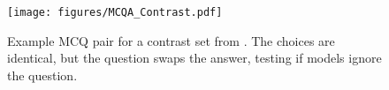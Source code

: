 \begin{figure}
    \centering
    \texttt{[image: figures/MCQA\_Contrast.pdf]}
    \vspace{-4.7ex}
    \setlength{\fboxsep}{0pt}
    \caption{\small Example MCQ pair for a contrast set from \citet{balepur2024your}. The choices are identical, but the question swaps the answer, testing if models ignore the question.}
    \label{fig:contrast}
    \vspace{-1.7ex}
\end{figure}